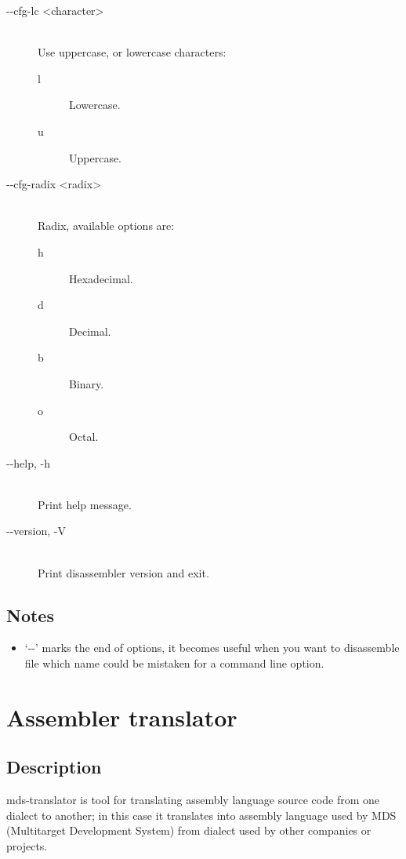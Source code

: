 \begin{description}
            \item[-{}-cfg-lc <character>]~\\
                Use uppercase, or lowercase characters:
                \begin{description}
                    \item [l] Lowercase.
                    \item [u] Uppercase.
                \end{description}

            \item[-{}-cfg-radix <radix>]~\\
                Radix, available options are:
                \begin{description}
                    \item [h] Hexadecimal.
                    \item [d] Decimal.
                    \item [b] Binary.
                    \item [o] Octal.
                \end{description}

            \item[-{}-help, -h]~\\
                Print help message.

            \item[-{}-version, -V]~\\
                Print disassembler version and exit.
        \end{description}

    \subsection{Notes}
        \begin{itemize}
            \item `-{}-' marks the end of options, it becomes useful when you want to disassemble file which name could be mistaken for a command line option.
        \end{itemize}

\section{Assembler translator}
    \subsection{Description}
        mds-translator is tool for translating assembly language source code from one dialect to another; in this case it translates into assembly language used by MDS (Multitarget Development System) from dialect used by other companies or projects.

